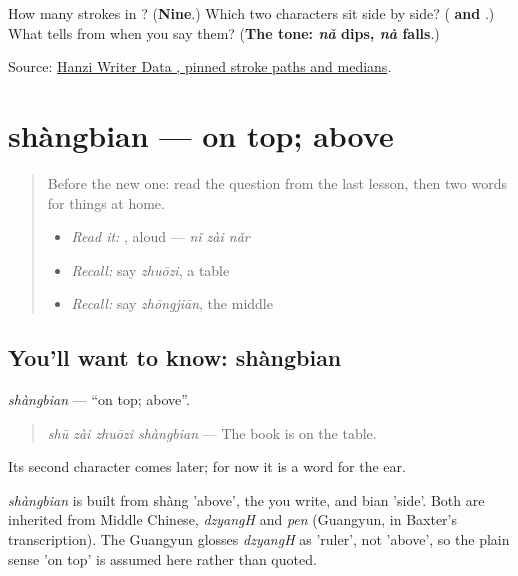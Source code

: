 \begin{tcolorbox}[breakable,colback=teal!4,colframe=teal!35!black,title={Before you move on}]
How many strokes in ? (\textbf{Nine}.) Which two characters sit side by side? (\textbf{ and }.) What tells  from  when you say them? (\textbf{The tone: \emph{nǎ} dips, \emph{nà} falls}.)

Source: \href{https://raw.githubusercontent.com/chanind/hanzi-writer-data/68d10a4b21150cae5e1ebbd223eed289cf32d90c/data/\%E5\%93\%AA.json}{Hanzi Writer Data , pinned stroke paths and medians}.
\end{tcolorbox}
\section[shàngbian]{shàngbian — on top; above}

\label{lesson:ZH-C86-shangbian}



\begin{quote}
Before the new one: read the question from the last lesson, then two words for things at home.

\begin{itemize}
\raggedright
  \item \emph{Read it:} , aloud — \emph{nǐ zài nǎr}
  \item \emph{Recall:} say \emph{zhuōzi}, a table
  \item \emph{Recall:} say \emph{zhōngjiān}, the middle
\end{itemize}
\end{quote}

\subsection*{You'll want to know: shàngbian}
\emph{shàngbian} — \textquotedblleft{}on top; above\textquotedblright{}.

\begin{quote}
\emph{shū zài zhuōzi shàngbian} — The book is on the table.
\end{quote}

Its second character comes later; for now it is a word for the ear.

\begin{cousinweb}
\emph{shàngbian} is built from shàng 'above', the  you write, and bian 'side'. Both are inherited from Middle Chinese, \emph{dzyangH} and \emph{pen} (Guangyun, in Baxter's transcription). The Guangyun glosses \emph{dzyangH} as 'ruler', not 'above', so the plain sense 'on top' is assumed here rather than quoted.
\end{cousinweb}


